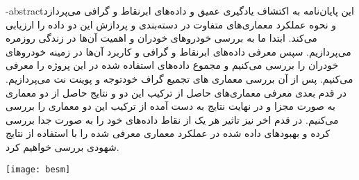 \department{}
\secondsupervisor{}

\fa-abstract{این پایان‌نامه به اکتشاف یادگیری عمیق و داده‌های ابرنقاط و گرافی می‌پردازد و نحوه عملکرد معماری‌های متفاوت در دسته‌بندی و پردازش این دو داده را ارزیابی می‌کند.
ابتدا ما به بررسی خودرو‌های خودران و اهمیت آن‌ها در زندگی روزمره می‌پردازیم.
سپس معرفی داده‌های ابرنقاط 
و گرافی و کاربرد آن‌ها در زمینه خودرو‌های خودران را بررسی می‌کنیم و مجموع داده‌های استفاده شده در این پروژه را معرفی می‌کنیم.
پس از آن بررسی معماری های تجمیع گراف خود‌توجه
و پوینت نت 
می‌پردازیم.
در قدم بعدی معرفی معماری‌های حاصل از ترکیب این دو و نتایج حاصل از دو معماری به صورت مجزا و در نهایت نتایج به دست آمده از ترکیب این دو معماری را بررسی می‌کنیم.
در قدم اخر نیز تاثیر هر یک از نقاط داده‌های خود را به صورت جدا بررسی کرده و بهبود‌های داده شده در عملکرد معماری معرفی شده را با استفاده از نتایج شهودی بررسی خواهیم کرد.
}





\vspace*{7cm}
\thispagestyle{empty}
\begin{center}
\texttt{[image: besm]}
\end{center}